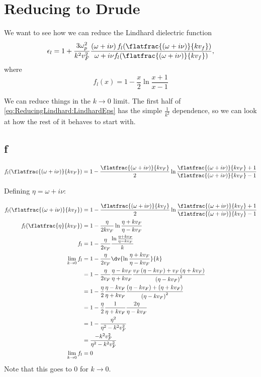 \documentclass[../../main.tex]{subfiles}
\newcommand{\vf}{v_F}
\begin{document}
\section{Reducing to Drude}
We want to see how we can reduce the Lindhard dielectric function
\begin{equation} \label{eq:ReducingLindhard:LindhardEps} 
 \epsilon_l = 1 + \frac{3 \omega_p^2}{k^2 v_F^2} \frac{\left(\omega + i \nu \right) f_l(\flatfrac{(\omega + i \nu)}{k v_f})}{\omega + i \nu f_l(\flatfrac{(\omega + i \nu)}{k v_f})},
\end{equation}
where 
\begin{equation}
	f_l(x) = 1 - \frac{x}{2} \ln\frac{x + 1}{x - 1}
\end{equation}

We can reduce things in the $k \rightarrow 0$ limit. The first half of \eqref{eq:ReducingLindhard:LindhardEps} has the simple $\frac{1}{k^2}$ dependence, so we can look at how the rest of it behaves to start with. 

\subsection{f}

\begin{align}
		f_l(\flatfrac{(\omega + i \nu)}{k v_F}) = 1 - \frac{\flatfrac{(\omega + i \nu)}{k v_F}}{2} \ln\frac{\flatfrac{(\omega + i \nu)}{k v_F} + 1}{\flatfrac{(\omega + i \nu)}{k v_F} - 1}
\end{align}

Defining $\eta = \omega + i \nu$:

\begin{align}
	f_l(\flatfrac{(\omega + i \nu)}{k v_f}) &= 1 - \frac{\flatfrac{(\omega + i \nu)}{k v_f}}{2} \ln\frac{\flatfrac{(\omega + i \nu)}{k v_f} + 1}{\flatfrac{(\omega + i \nu)}{k v_f} - 1} \\
	f_l(\flatfrac{\eta}{k \vf}) &= 1 - \frac{\eta}{2 k \vf} \ln\frac{\eta + k \vf}{\eta - k\vf} \\
	f_l &=  1 - \frac{\eta}{2 \vf} \frac{\ln\frac{\eta + k \vf}{\eta - k\vf}}{k} \\ 
	\lim_{k \to 0} f_l &= 1 - \frac{\eta}{2 \vf} \dv{\ln\frac{\eta + k \vf}{\eta - k\vf}}{k} \\
	&= 1 - \frac{\eta}{2 \vf} \frac{\eta - k \vf}{\eta + k\vf} \frac{\vf \left(\eta - k\vf \right)+ \vf \left(\eta + k \vf \right)}{\left( \eta - k \vf \right)^2} \\
	&= 1 - \frac{\eta}{2 } \frac{\eta - k \vf}{\eta + k\vf} \frac{\left(\eta - k\vf \right)+  \left(\eta + k \vf \right)}{\left( \eta - k \vf \right)^2} \\
	&= 1 - \frac{\eta}{2 } \frac{1}{\eta + k\vf} \frac{2 \eta}{\eta - k \vf } \\
	&= 1 - \frac{\eta^2}{\eta^2 - k^2 \vf^2} \\
	&= \frac{-k^2 \vf^2}{\eta^2 - k^2 \vf^2} \label{eq:ReducingLindhard:f} \\
	\lim_{k \to 0} f_l &= 0
\end{align}
Note that this goes to $0$ for $k \to 0$.
\end{document}
